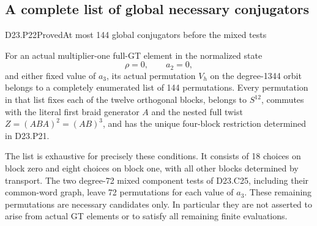 \subsection{A complete list of global necessary conjugators}

\begin{statement}{D23.P22}{Proved}{At most 144 global conjugators before the mixed tests}
\end{statement}
For an actual multiplier-one full-GT element in the normalized
state
\[
                     \rho=0,\qquad a_2=0,
\]
and either fixed value of $a_3$, its actual permutation
$V_h$ on the degree-1344 orbit belongs to a completely
enumerated list of 144 permutations. Every permutation in
that list fixes each of the twelve orthogonal blocks,
belongs to $S^{12}$, commutes with the literal first braid
generator $A$ and the nested full twist
$Z=(ABA)^2=(AB)^3$, and has the unique four-block
restriction determined in D23.P21.

The list is exhaustive for precisely these conditions.
It consists of 18 choices on block zero and eight choices
on block one, with all other blocks determined by transport.
The two degree-72 mixed component tests of D23.C25,
including their common-word graph, leave 72 permutations
for each value of $a_3$. These remaining permutations are
necessary candidates only. In particular they are not
asserted to arise from actual GT elements or to satisfy all
remaining finite evaluations.

